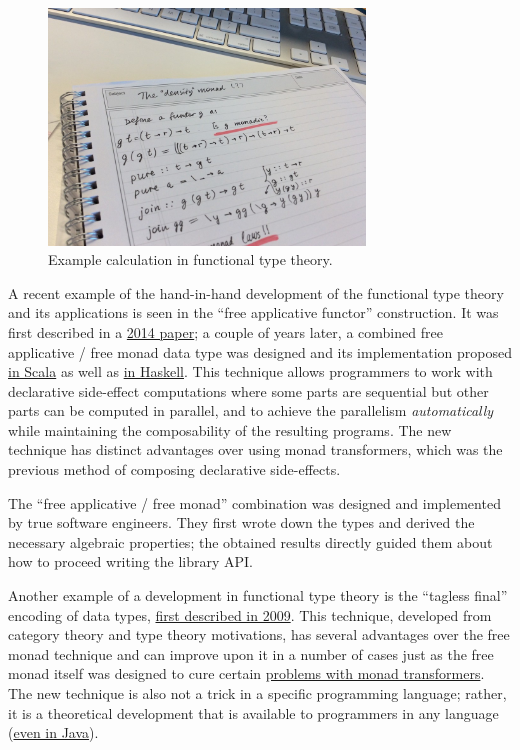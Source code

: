 \begin{figure}
\begin{centering}
\includegraphics[width=0.75\textwidth]{ftt-example}
\par\end{centering}
\caption{Example calculation in functional type theory.}
\label{ftt-example}
\end{figure}

A recent example of the hand-in-hand development of the functional
type theory and its applications is seen in the ``free applicative
functor'' construction. It was first described in a \href{https://arxiv.org/pdf/1403.0749.pdf}{2014 paper};
a couple of years later, a combined free applicative / free monad
data type was designed and its implementation proposed \href{https://github.com/typelevel/cats/issues/983}{in Scala}
as well as \href{https://elvishjerricco.github.io/2016/04/08/applicative-effects-in-free-monads.html}{in Haskell}.
This technique allows programmers to work with declarative side-effect
computations where some parts are sequential but other parts can be
computed in parallel, and to achieve the parallelism \emph{automatically}
while maintaining the composability of the resulting programs. The
new technique has distinct advantages over using monad transformers,
which was the previous method of composing declarative side-effects.

The ``free applicative / free monad'' combination was designed and
implemented by true software engineers. They first wrote down the
types and derived the necessary algebraic properties; the obtained
results directly guided them about how to proceed writing the library
API.

Another example of a development in functional type theory is the
 ``tagless final'' encoding of data types, \href{http://okmij.org/ftp/tagless-final/index.html}{first described in 2009}.
This technique, developed from category theory and type theory motivations,
has several advantages over the free monad technique and can improve
upon it in a number of cases \textendash{} just as the free monad
itself was designed to cure certain \href{http://blog.ezyang.com/2013/09/if-youre-using-lift-youre-doing-it-wrong-probably/}{problems with monad transformers}.
The new technique is also not a trick in a specific programming language;
rather, it is a theoretical development that is available to programmers
in any language (\href{https://oleksandrmanzyuk.wordpress.com/2014/06/18/from-object-algebras-to-finally-tagless-interpreters-2/}{even in Java}).

